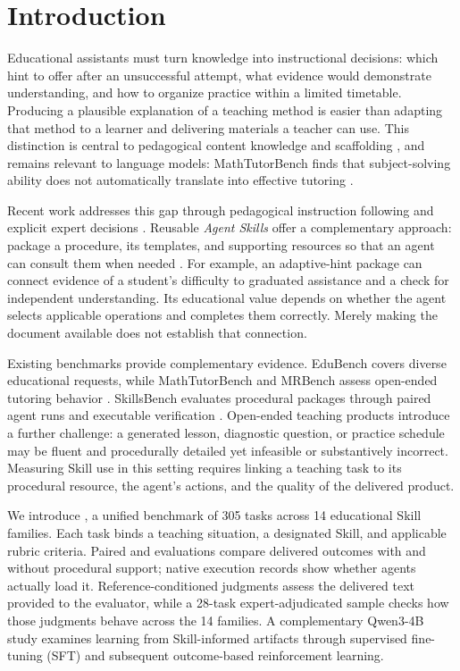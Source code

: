 \section{Introduction}

Educational assistants must turn knowledge into instructional decisions: which
hint to offer after an unsuccessful attempt, what evidence would demonstrate
understanding, and how to organize practice within a limited timetable.
Producing a plausible explanation of a teaching method is easier than adapting
that method to a learner and delivering materials a teacher can use. This
distinction is central to pedagogical content knowledge and scaffolding
\citep{shulman1986,wood1976}, and remains relevant to language models:
MathTutorBench finds that subject-solving ability does not automatically
translate into effective tutoring \citep{mathtutorbench}.

Recent work addresses this gap through pedagogical instruction following and
explicit expert decisions \citep{learnlm,bridge}. Reusable \emph{Agent Skills}
offer a complementary approach: package a procedure, its templates, and
supporting resources so that an agent can consult them when needed
\citep{agentskills}. For example, an adaptive-hint package can connect evidence
of a student's difficulty to graduated assistance and a check for independent
understanding. Its educational value depends on whether the agent selects
applicable operations and completes them correctly. Merely making the document
available does not establish that connection.

Existing benchmarks provide complementary evidence. EduBench covers diverse
educational requests, while MathTutorBench and MRBench assess open-ended
tutoring behavior \citep{edubench,mathtutorbench,mrbench}. SkillsBench evaluates
procedural packages through paired agent runs and executable verification
\citep{skillsbench}. Open-ended teaching products introduce a further challenge:
a generated lesson, diagnostic question, or practice schedule may be fluent
and procedurally detailed yet infeasible or substantively incorrect. Measuring
Skill use in this setting requires linking a teaching task to its procedural
resource, the agent's actions, and the quality of the delivered product.

We introduce \bench{}, a unified benchmark of 305 tasks across 14 educational
Skill families. Each task binds a teaching situation, a designated Skill, and
applicable rubric criteria. Paired \noskill{} and \withskill{} evaluations
compare delivered outcomes with and without procedural support; native execution records
show whether agents actually load it. Reference-conditioned judgments assess
the delivered text provided to the evaluator, while a 28-task expert-adjudicated sample checks
how those judgments behave across the 14 families. A complementary Qwen3-4B
study examines learning from Skill-informed artifacts through supervised
fine-tuning (SFT) and subsequent outcome-based reinforcement learning.

